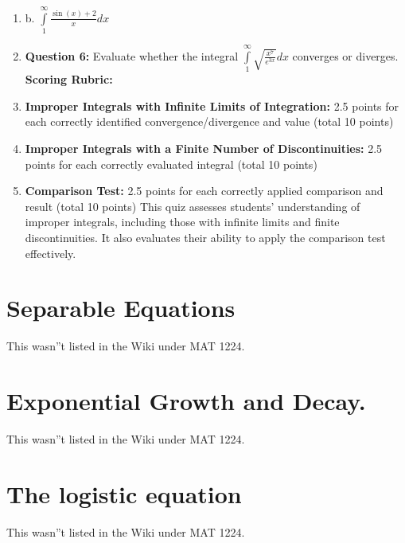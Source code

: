 \begin{enumerate}
    \item b. $\int\limits _1^\infty \frac{\sin(x) + 2}{x} dx$
    \item \textbf{Question 6:} Evaluate whether the integral $\int\limits _1^\infty \sqrt{\frac{x^7}{e^{3x}}} dx$ converges or diverges. \textbf{Scoring Rubric:}
    \item \textbf{Improper Integrals with Infinite Limits of Integration:} 2.5 points for each correctly identified convergence/divergence and value (total 10 points)
    \item \textbf{Improper Integrals with a Finite Number of Discontinuities:} 2.5 points for each correctly evaluated integral (total 10 points)
    \item \textbf{Comparison Test:} 2.5 points for each correctly applied comparison and result (total 10 points) This quiz assesses students' understanding of improper integrals, including those with infinite limits and finite discontinuities. It also evaluates their ability to apply the comparison test effectively.
\end{enumerate}

\section{Separable Equations}
\label{sec:separable-equations}

This wasn''t listed in the Wiki under MAT 1224.

\section{Exponential Growth and Decay.}
\label{sec:exponential-growth-and-decay}

This wasn''t listed in the Wiki under MAT 1224.

\section{The logistic equation}
\label{sec:the-logistic-equation}

This wasn''t listed in the Wiki under MAT 1224.

